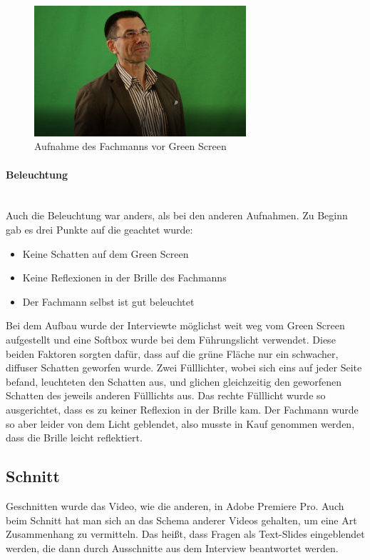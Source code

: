\begin{figure}[H] 
  \centering
     \includegraphics[width=0.7\textwidth]{video_abb1.png}
  \caption{Aufnahme des Fachmanns vor Green Screen}
\end{figure}

\paragraph{Beleuchtung}
\leavevmode \\
Auch die Beleuchtung war anders, als bei den anderen Aufnahmen. Zu Beginn gab es drei Punkte auf die geachtet wurde:
\begin{itemize}
\item Keine Schatten auf dem Green Screen
\item Keine Reflexionen in der Brille des Fachmanns
\item Der Fachmann selbst ist gut beleuchtet 
\end{itemize}
Bei dem Aufbau wurde der Interviewte möglichst weit weg vom Green Screen aufgestellt und eine Softbox wurde bei dem Führungslicht verwendet. Diese beiden Faktoren sorgten dafür, dass auf die grüne Fläche nur ein schwacher, diffuser Schatten geworfen wurde. Zwei Fülllichter, wobei sich eins auf jeder Seite befand, leuchteten den Schatten aus, und glichen gleichzeitig den geworfenen Schatten des jeweils anderen Fülllichts aus. Das rechte Fülllicht wurde so ausgerichtet, dass es zu keiner Reflexion in der Brille kam. Der Fachmann wurde so aber leider von dem Licht geblendet, also musste in Kauf genommen werden, dass die Brille leicht reflektiert.
\subsection{Schnitt}
Geschnitten wurde das Video, wie die anderen, in Adobe Premiere Pro. Auch beim Schnitt hat man sich an das Schema anderer Videos gehalten, um eine Art Zusammenhang zu vermitteln. Das heißt, dass Fragen als Text-Slides eingeblendet werden, die dann durch Ausschnitte aus dem Interview beantwortet werden.
